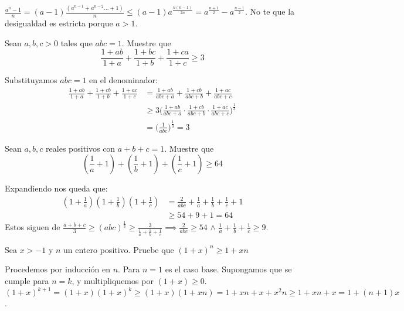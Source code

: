 \begin{sol}
	$\frac{a^n-1}{n} = (a-1)\frac{(a^{n-1} + a^{n-2} \dots +1 ) }{n}\leq (a-1) a^{\frac{n(n-1)}{2n}} = a^{\frac{n+1}{2}} - a^{\frac{n-1}{2}}$. No te que la desigualdad es estricta porque $a>1$. 
\end{sol}

\begin{ejer}
	Sean $a,b,c>0$ tales que $abc=1$. Muestre que
	\begin{equation}
		\frac{1+ab}{1+a} + \frac{1+bc}{1+b} + \frac{1+ca}{1+c} \geq 3
	\end{equation}
\end{ejer}
\begin{sol}
	Substituyamos $abc = 1$ en el denominador:
	\begin{align}
	\frac{1+ab}{1+a}+\frac{1+cb}{1+b}+\frac{1+ac}{1+c} &= \frac{1+ab}{abc+a}+\frac{1+cb}{abc+b}+\frac{1+ac}{abc+c}\\
	& \geq 3 \bigg(\frac{1+ab}{abc+a}\cdot \frac{1+cb}{abc+b}\cdot\frac{1+ac}{abc+c}\bigg)^{\frac{1}{3}} \\
	&= \bigg( \frac{1}{abc} \bigg) ^{\frac{1}{3}} = 3 
	\end{align}
\end{sol}

\begin{ejer}
	Sean $a,b,c$ reales positivos con $a+b+c=1$. Muestre que
	\begin{equation}
		\left(\frac{1}{a}+ 1\right) + \left(\frac{1}{b}+ 1\right) + \left(\frac{1}{c}+ 1\right) \geq 64
	\end{equation}
\end{ejer}

\begin{sol}
	Expandiendo nos queda que:
	\begin{align}
	(1+\frac{1}{a})(1+\frac{1}{b})(1+\frac{1}{c}) &= \frac{2}{abc} + \frac{1}{a}+\frac{1}{b} + \frac{1}{c} + 1 \\
	&\geq 54 + 9 +1 =  64
	\end{align}
	Estos siguen de $\frac{a+b+c}{3} \geq (abc)^{\frac{1}{3}} \geq \frac{3}{\frac{1}{a}+\frac{1}{b} + \frac{1}{c}} \implies \frac{2}{abc} \geq 54$ $\land$ $\frac{1}{a}+\frac{1}{b} + \frac{1}{c} \geq 9$. 
\end{sol}

\begin{ejer}
	Sea $x > -1$ y $n$ un entero positivo. Pruebe que $(1+x)^{n} \geq 1+xn$
\end{ejer}

\begin{sol}
	Procedemos por inducci\'on en $n$. Para $n = 1$ es el caso base. Supongamos que se cumple para $n = k$, y multipliquemos por $(1+x)\geq 0$. $(1+x)^{k+1} = (1+x)(1+x)^{k} \geq (1+x)(1+xn) = 1+xn+x+x^2n \geq 1+xn+x = 1+ (n+1)x$. 
\end{sol}

